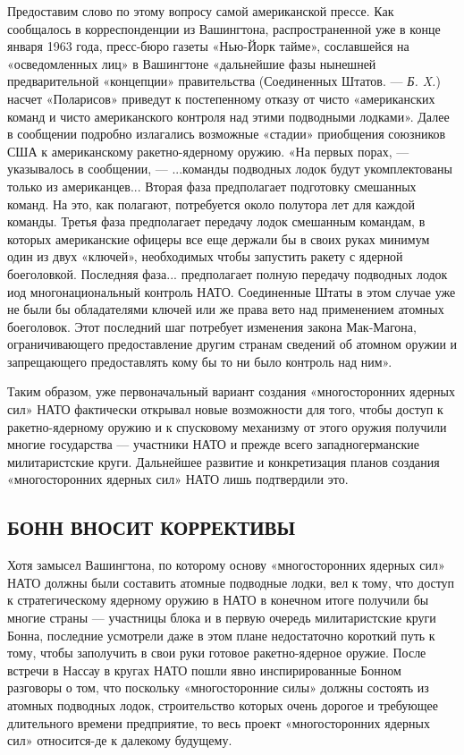 \documentclass[12pt, a4paper, openany]{book}
\begin{document}
Предоставим слово по этому вопросу самой американской прессе. Как сообщалось в корреспонденции из Вашингтона, распространенной уже в конце января 1963 года, пресс-бюро газеты «Нью-Йорк тайме», сославшейся на «осведомленных лиц» в Вашингтоне «дальнейшие фазы нынешней предварительной «концепции» правительства (Соединенных Штатов. — \textit{Б. X.}) насчет «Поларисов» приведут к постепенному отказу от чисто «американских команд и чисто американского контроля над этими подводными лодками». Далее в сообщении подробно излагались возможные «стадии» приобщения союзников США к американскому ракетно-ядерному оружию. «На первых порах, — указывалось в сообщении, — ...команды подводных лодок будут укомплектованы только из американцев... Вторая фаза предполагает подготовку смешанных команд. На это, как полагают, потребуется около полутора лет для каждой команды. Третья фаза предполагает передачу лодок смешанным командам, в которых американские офицеры все еще держали бы в своих руках минимум один из двух «ключей», необходимых чтобы запустить ракету с ядерной боеголовкой. Последняя фаза... предполагает полную передачу подводных лодок иод многонациональный контроль НАТО. Соединенные Штаты в этом случае уже не были бы обладателями ключей или же права вето над применением атомных боеголовок. Этот последний шаг потребует изменения закона Мак-Магона, ограничивающего предоставление другим странам сведений об атомном оружии и запрещающего предоставлять кому бы то ни было контроль над ним».

Таким образом, уже первоначальный вариант создания «многосторонних ядерных сил» НАТО фактически открывал новые возможности для того, чтобы доступ к ракетно-ядерному оружию и к спусковому механизму от этого оружия получили многие государства — участники НАТО и прежде всего западногерманские милитаристские круги. Дальнейшее развитие и конкретизация планов создания «многосторонних ядерных сил» НАТО лишь подтвердили это.

	\subsection[Бонн вносит коррективы]{\center БОНН ВНОСИТ КОРРЕКТИВЫ}


Хотя замысел Вашингтона, по которому основу «многосторонних ядерных сил» НАТО должны были составить атомные подводные лодки, вел к тому, что доступ к стратегическому ядерному оружию в НАТО в конечном итоге получили бы многие страны — участницы блока и в первую очередь милитаристские круги Бонна, последние усмотрели даже в этом плане недостаточно короткий путь к тому, чтобы заполучить в свои руки готовое ракетно-ядерное оружие. После встречи в Нассау в кругах НАТО пошли явно инспирированные Бонном разговоры о том, что поскольку «многосторонние силы» должны состоять из атомных подводных лодок, строительство которых очень дорогое и требующее длительного времени предприятие, то весь проект «многосторонних ядерных сил» относится-де к далекому будущему.
\end{document}
